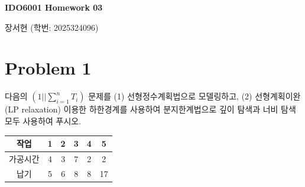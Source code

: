 \documentclass[10pt]{article}
\begin{document}
\begin{center}
    {\LARGE\bfseries IDO6001 Homework 03 \par}
    \vspace{1em}
    {\large 장서현 (학번: 2025324096) \par}
\end{center}
\vspace{0.5em}

\section{Problem 1}
다음의 $(1||\sum_{i=1}^n T_i)$ 문제를 (1) 선형정수계획법으로 모델링하고, (2) 선형계획이완(LP relaxation) 이용한 하한경계를 사용하여 분지한계법으로 깊이 탐색과 너비 탐색 모두 사용하여 푸시오. 
\begin{table}[h!]
    \centering
    \begin{tabular}{c|ccccc}
    \hline
    작업 & 1 & 2 & 3 & 4 & 5 \\ \hline
    가공시간 & 4 & 3 & 7 & 2 & 2 \\
    납기 & 5 & 6 & 8 & 8 & 17 \\ \hline
    \end{tabular}
    \end{table}
\end{document}
